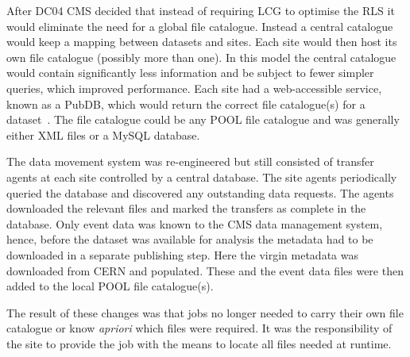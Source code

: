 After DC04 CMS decided that instead of requiring LCG to optimise the RLS it would eliminate the need for a global file catalogue. Instead a central catalogue would keep a mapping between datasets and sites. Each site would then host its own file catalogue (possibly more than one). In this model the central catalogue would contain significantly less information and be subject to fewer simpler queries, which improved performance. Each site had a web-accessible service, known as a  PubDB, which would return the correct file catalogue(s) for a dataset~\cite{citeulike:623034}. The file catalogue could be any POOL file catalogue and was generally either XML files or a MySQL database. 

The data movement system was re-engineered but still consisted of transfer agents at each site controlled by a central database. The site agents periodically queried the database and discovered any outstanding data requests. The agents downloaded the relevant files and marked the transfers as complete in the database. Only event data was known to the CMS data management system, hence, before the dataset was available for analysis the metadata had to be downloaded in a separate publishing step. Here the virgin metadata was downloaded from CERN and populated. These and the event data files were then added to the local POOL file catalogue(s).

The result of these changes was that jobs no longer needed to carry their own file catalogue or know \emph{apriori} which files were required. It was the responsibility of the site to provide the job with the means to locate all files needed at runtime.


